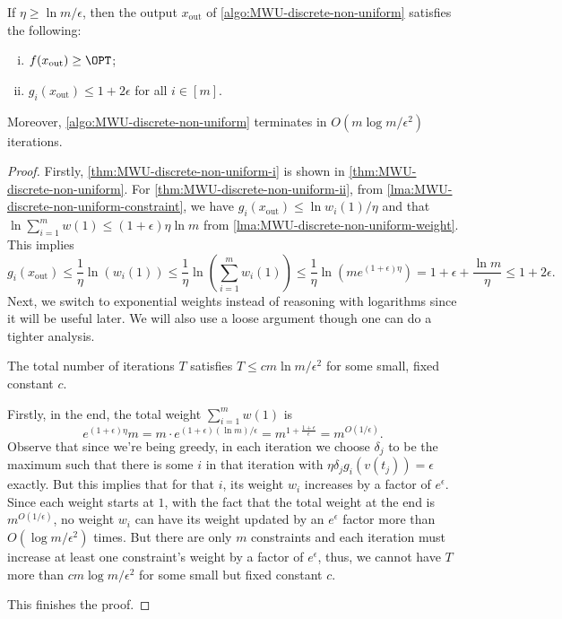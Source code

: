 \begin{theorem}\label{thm:MWU-discrete-non-uniform}
	If \(\eta \geq \ln m / \epsilon \), then the output \(x_{\text{out} }\) of \autoref{algo:MWU-discrete-non-uniform} satisfies the following:
	\begin{enumerate}[(i)]
		\item\label{thm:MWU-discrete-non-uniform-i} \(f(x_{\text{out} }) \geq \OPT\);
		\item\label{thm:MWU-discrete-non-uniform-ii} \(g_i(x_{\text{out} }) \leq 1 + 2\epsilon \) for all \(i \in [m]\).
	\end{enumerate}
	Moreover, \autoref{algo:MWU-discrete-non-uniform} terminates in \(O(m \log m / \epsilon ^2)\) iterations.
\end{theorem}
\begin{proof}
	Firstly, \autoref{thm:MWU-discrete-non-uniform-i} is shown in \autoref{thm:MWU-discrete-non-uniform}. For \autoref{thm:MWU-discrete-non-uniform-ii}, from \autoref{lma:MWU-discrete-non-uniform-constraint}, we have \(g_i(x_{\text{out} }) \leq \ln w_i(1) / \eta \) and that \(\ln \sum_{i=1}^{m} w(1) \leq (1 + \epsilon ) \eta \ln m\) from \autoref{lma:MWU-discrete-non-uniform-weight}. This implies
	\[
		g_i(x _{\text{out} })
		\leq \frac{1}{\eta } \ln (w_i(1))
		\leq \frac{1}{\eta } \ln (\sum_{i=1}^{m} w_i(1))
		\leq \frac{1}{\eta } \ln (m e^{(1 + \epsilon ) \eta })
		= 1 + \epsilon + \frac{\ln m}{\eta }
		\leq 1 + 2\epsilon .
	\]
	Next, we switch to exponential weights instead of reasoning with logarithms since it will be useful later. We will also use a loose argument though one can do a tighter analysis.
	\begin{claim}
		The total number of iterations \(T\) satisfies \(T \leq c m \ln m / \epsilon ^2\) for some small, fixed constant \(c\).
	\end{claim}
	\begin{explanation}
		Firstly, in the end, the total weight \(\sum_{i=1}^{m} w(1)\) is
		\[
			e^{(1 + \epsilon ) \eta }m
			= m \cdot e^{(1 + \epsilon ) (\ln m) / \epsilon }
			= m^{1 + \frac{1 + \epsilon }{\epsilon }}
			= m^{O(1 / \epsilon )}.
		\]
		Observe that since we're being greedy, in each iteration we choose \(\delta _j\) to be the maximum such that there is some \(i\) in that iteration with \(\eta \delta _j g_i(v(t_j)) = \epsilon \) exactly. But this implies that for that \(i\), its weight \(w_i\) increases by a factor of \(e^{\epsilon } \). Since each weight starts at \(1\), with the fact that the total weight at the end is \(m^{O(1 / \epsilon )}\), no weight \(w_i\) can have its weight updated by an \(e^{\epsilon } \) factor more than \(O(\log m / \epsilon ^2)\) times. But there are only \(m\) constraints and each iteration must increase at least one constraint's weight by a factor of \(e^{\epsilon } \), thus, we cannot have \(T\) more than \(cm \log m / \epsilon ^2\) for some small but fixed constant \(c\).
	\end{explanation}
	This finishes the proof.
\end{proof}

